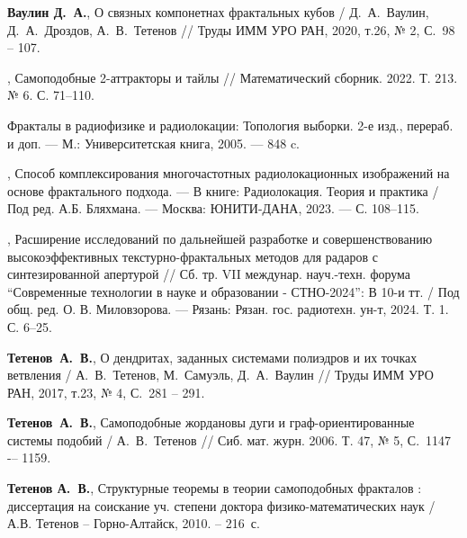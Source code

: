 \begin{thebibliography}{99}
{\bf Ваулин Д.~А.},
О связных компонетнах фрактальных кубов / 
Д.~А.~Ваулин, Д.~А.~Дроздов, А.~В.~Тетенов //
Труды ИММ УРО РАН, 2020, т.26, № 2, С.~98 -- 107.

,
Самоподобные 2-аттракторы и тайлы // Математический сборник. 2022. Т. 213. № 6. С. 71--110.

Фракталы в радиофизике и радиолокации: Топология выборки. 
2-е изд., перераб. и доп. --- М.: Университетская книга, 2005. --- 848 c.

,
Способ комплексирования многочастотных радиолокационных изображений на основе фрактального подхода. --- В книге: Радиолокация. Теория и практика / Под ред. А.Б. Бляхмана. --- Москва: ЮНИТИ-ДАНА, 2023. --- С. 108--115. 

, 
Расширение исследований по дальнейшей разработке и совершенствованию высокоэффективных текстурно-фрактальных методов для радаров с синтезированной апертурой // 
Сб. тр. VII междунар. науч.-техн. форума “Современные технологии в науке и образовании - СТНО-2024”: В 10-и тт. / Под общ. ред. О. В. Миловзорова. --- Рязань: Рязан. гос. радиотехн. ун-т, 2024. Т. 1. С. 6--25.

{\bf Тетенов~А.~В.},  
О дендритах, заданных системами полиэдров и их точках ветвления /
А.~В.~Тетенов, М.~Самуэль, Д.~А.~Ваулин // 
Труды ИММ УРО РАН, 2017, т.23, № 4, С.~281 -- 291.

{\bf Тетенов~А.~В.},
Самоподобные жордановы дуги и граф-ориентированные системы подобий /
А.~В.~Тетенов //
Сиб. мат. журн. 2006. Т. 47, № 5, С.~1147 -– 1159.

{\bf Тетенов А.~В.}, 
Структурные теоремы в теории самоподобных фракталов : диссертация на соискание уч. степени доктора физико-математических наук / А.В. Тетенов -- Горно-Алтайск, 2010. -- 216~с. 


%


\end{thebibliography}
